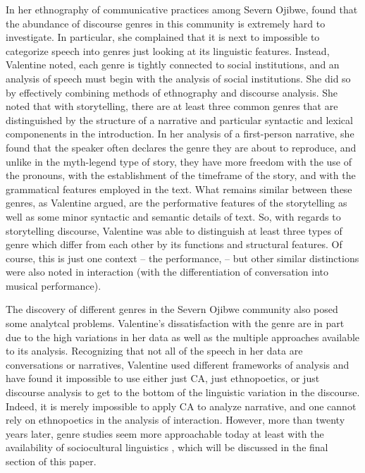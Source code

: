 \documentclass[12pt]{article}
\begin{document}
In her ethnography of communicative practices among Severn Ojibwe, \textcite{valentine1995} found that the abundance of discourse genres in this community is extremely hard to investigate. In particular, she complained that it is next to impossible to categorize speech into genres just looking at its linguistic features. Instead, Valentine noted, each genre is tightly connected to  social institutions, and an analysis of speech must begin with the analysis of social institutions. She did so by effectively combining methods of ethnography and discourse analysis. She noted that with storytelling, there are at least three common genres that are distinguished by the structure of a narrative and particular syntactic and lexical componenents in the introduction. In her analysis of a first-person narrative, she found that the speaker often declares the genre they are about to reproduce, and unlike in the myth-legend type of story, they have more freedom with the use of the pronouns, with the establishment of the timeframe of the story, and with the grammatical features employed in the text. What remains similar between these genres, as Valentine argued, are the performative features of the storytelling as well as some minor syntactic and semantic details of text. So, with regards to storytelling discourse, Valentine was able to distinguish at least three types of genre which differ from each other by its functions and structural features. Of course, this is just one context -- the performance, -- but other similar distinctions were also noted in interaction (with the differentiation of conversation into musical performance).

The discovery of different genres in the Severn Ojibwe community also posed some analytcal problems. Valentine's dissatisfaction with the genre are in part due to the high variations in her data as well as the multiple approaches available to its analysis. Recognizing that not all of the speech in her data are conversations or narratives, Valentine used different frameworks of analysis and have found it impossible to use either just CA, just ethnopoetics, or just discourse analysis to get to the bottom of the linguistic variation in the discourse. Indeed, it is merely impossible to apply CA to analyze narrative, and one cannot rely on ethnopoetics in the analysis of interaction. However, more than twenty years later, genre studies seem more approachable today at least with the availability of sociocultural linguistics \parencite{bucholtz2008}, which will be discussed in the final section of this paper.
\end{document}
